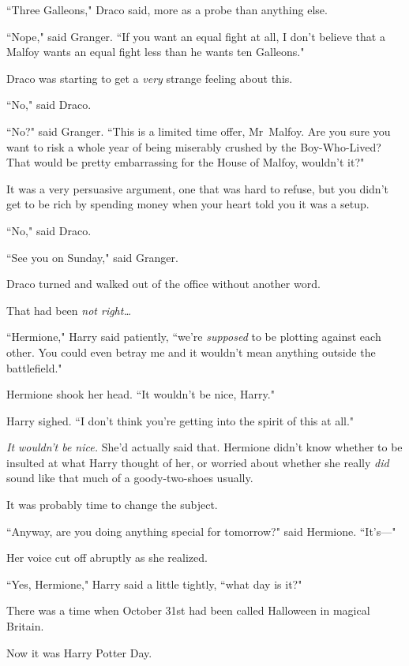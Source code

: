 ``Three Galleons," Draco said, more as a probe than anything else.

``Nope," said Granger. ``If you want an equal fight at all, I don't believe that a Malfoy wants an equal fight less than he wants ten Galleons."

Draco was starting to get a \emph{very} strange feeling about this.

``No," said Draco.

``No?" said Granger. ``This is a limited time offer, Mr~Malfoy. Are you sure you want to risk a whole year of being miserably crushed by the Boy-Who-Lived? That would be pretty embarrassing for the House of Malfoy, wouldn't it?"

It was a very persuasive argument, one that was hard to refuse, but you didn't get to be rich by spending money when your heart told you it was a setup.

``No," said Draco.

``See you on Sunday," said Granger.

Draco turned and walked out of the office without another word.

That had been \emph{not right{\ldots}}

\later

``Hermione," Harry said patiently, ``we're \emph{supposed} to be plotting against each other. You could even betray me and it wouldn't mean anything outside the battlefield."

Hermione shook her head. ``It wouldn't be nice, Harry."

Harry sighed. ``I don't think you're getting into the spirit of this at all."

\emph{It wouldn't be nice.} She'd actually said that. Hermione didn't know whether to be insulted at what Harry thought of her, or worried about whether she really \emph{did} sound like that much of a goody-two-shoes usually.

It was probably time to change the subject.

``Anyway, are you doing anything special for tomorrow?" said Hermione. ``It's—"

Her voice cut off abruptly as she realized.

``Yes, Hermione," Harry said a little tightly, ``what day is it?"


There was a time when October 31st had been called Halloween in magical Britain.

Now it was Harry Potter Day.

